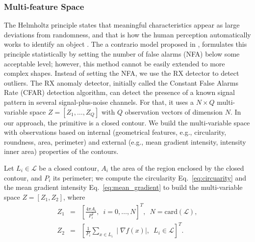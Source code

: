 \subsubsection{Multi-feature Space}\label{subsec:multispace}
The Helmholtz principle states that meaningful characteristics appear as large deviations from randomness, and that is how the human perception automatically works to identify an object \citep{Attneave:PR:1954}. The a contrario model proposed in \citep{Desolneux.Moisan.ea:Gestalt:2008}, formulates this principle statistically by setting the number of false alarms (NFA) below some acceptable level; however, this method cannot be easily extended to more complex shapes. Instead of setting the NFA, we use the RX detector \citep{Reed.Yu:TASSP:1990} to detect outliers. The RX anomaly detector, initially called the Constant False Alarms Rate (CFAR) detection algorithm, can detect the presence of a known signal pattern in several signal-plus-noise channels. For that, it uses a $N\times Q$ multi-variable space $Z=[Z_{1}, \ldots, Z_{Q}]$ with $Q$ observation vectors of dimension $N$. In our approach, the primitive is a closed contour. We build the multi-variable space with observations based on internal (geometrical features, e.g., circularity, roundness, area, perimeter) and external (e.g., mean gradient intensity, intensity inner area) properties of the contours.

Let $L_{i} \in \mathcal{L}$ be a closed contour, $A_{i}$ the area of the region enclosed by the closed contour, and $P_{i}$ its perimeter; we compute the circularity Eq.\ \eqref{eq:circuarity} and the mean gradient intensity Eq.\ \eqref{eq:mean_gradient} to build the multi-variable space $Z=[Z_{1}, Z_{2}]$, where
\begin{eqnarray}
Z_{1}&=&\left[\frac{4\pi A_{i}}{P_{i}^2}, \enspace i=0, \ldots, N\right]^T,  \enspace N = \mathrm{card}(\mathcal{L}), \label{eq:circuarity}  \\ 
Z_{2}&=&\left[\frac{1}{P_{i}}\sum\limits_{x \in L_{i}} \mid\nabla f(x) \mid, \enspace L_{i} \in \mathcal{L}\right]^T. \label{eq:mean_gradient}
\end{eqnarray}

